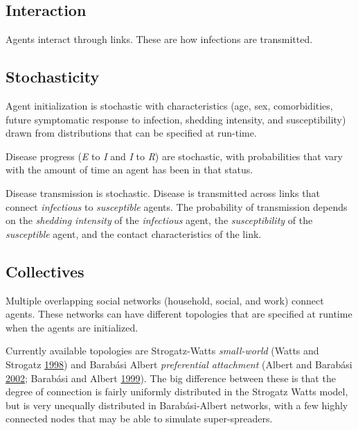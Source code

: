 \documentclass[
]{article}
\begin{document}
\hypertarget{interaction}{%
\subsection{Interaction}\label{interaction}}

Agents interact through links. These are how infections are transmitted.

\hypertarget{stochasticity}{%
\subsection{Stochasticity}\label{stochasticity}}

Agent initialization is stochastic with characteristics (age, sex,
comorbidities, future symptomatic response to infection, shedding
intensity, and susceptibility) drawn from distributions that can be
specified at run-time.

Disease progress (\emph{E} to \emph{I} and \emph{I} to \emph{R}) are
stochastic, with probabilities that vary with the amount of time an
agent has been in that status.

Disease transmission is stochastic. Disease is transmitted across links
that connect \emph{infectious} to \emph{susceptible} agents. The
probability of transmission depends on the \emph{shedding intensity} of
the \emph{infectious} agent, the \emph{susceptibility} of the
\emph{susceptible} agent, and the contact characteristics of the link.

\hypertarget{collectives}{%
\subsection{Collectives}\label{collectives}}

Multiple overlapping social networks (household, social, and work)
connect agents. These networks can have different topologies that are
specified at runtime when the agents are initialized.

Currently available topologies are Strogatz-Watts \emph{small-world}
(Watts and Strogatz
\protect\hyperlink{ref-watts:collective.dynamics:1998}{1998}) and
Barabási Albert \emph{preferential attachment} (Albert and Barabási
\protect\hyperlink{ref-albert:statistical.mechanics:2002}{2002};
Barabási and Albert
\protect\hyperlink{ref-barabasi:emergence.scaling:1999}{1999}). The big
difference between these is that the degree of connection is fairly
uniformly distributed in the Strogatz Watts model, but is very unequally
distributed in Barabási-Albert networks, with a few highly connected
nodes that may be able to simulate super-spreaders.
\end{document}
